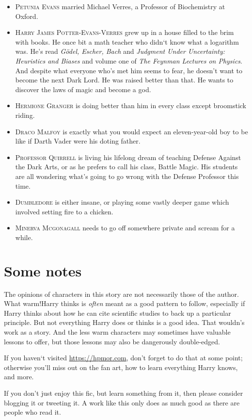 \begin{itemize}
\item \textsc{Petunia Evans} married Michael Verres, a Professor of Biochemistry at Oxford.
\item \textsc{Harry James Potter-Evans-Verres} grew up in a house filled to the brim with books. He once bit a math teacher who didn‘t know what a logarithm was. He’s read \emph{Gödel, Escher, Bach} and \emph{Judgment Under Uncertainty: Heuristics and Biases} and volume one of \emph{The Feynman Lectures on Physics}. And despite what everyone who’s met him seems to fear, he doesn’t want to become the next Dark Lord. He was raised better than that. He wants to discover the laws of magic and become a god.
\item \textsc{Hermione Granger} is doing better than him in every class except broomstick riding.
\item \textsc{Draco Malfoy} is exactly what you would expect an eleven-year-old boy to be like if Darth Vader were his doting father.
\item \textsc{Professor Quirrell} is living his lifelong dream of teaching Defense Against the Dark Arts, or as he prefers to call his class, Battle Magic. His students are all wondering what’s going to go wrong with the Defense Professor this time.
\item \textsc{Dumbledore} is either insane, or playing some vastly deeper game which involved setting fire to a chicken.
\item \textsc{Minerva Mcgonagall} needs to go off somewhere private and scream for a while.
\end{itemize}

% 
% 

\section*{Some notes}
The opinions of characters in this story are not necessarily those of the author. What warm!Harry thinks is \emph{often} meant as a good pattern to follow, especially if Harry thinks about how he can cite scientific studies to back up a particular principle. But not everything Harry does or thinks is a good idea. That wouldn’s work as a story. And the less warm characters may sometimes have valuable lessons to offer, but those lessons may also be dangerously double-edged.

If you haven‘t visited \url{https://hpmor.com}, don’t forget to do that at some point; otherwise you'll miss out on the fan art, how to learn everything Harry knows, and more.

If you don’t just enjoy this fic, but learn something from it, then please consider blogging it or tweeting it. A work like this only does as much good as there are people who read it.


